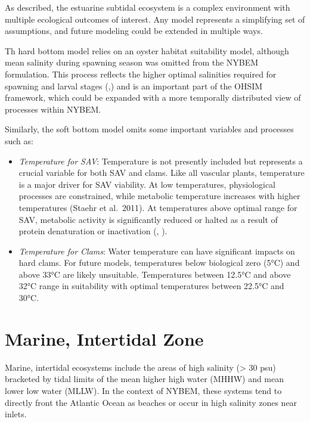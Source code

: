 \documentclass[
]{book}
\begin{document}
As described, the estuarine subtidal ecosystem is a complex environment with multiple ecological outcomes of interest. Any model represents a simplifying set of assumptions, and future modeling could be extended in multiple ways.

Th hard bottom model relies on an oyster habitat suitability model, although mean salinity during spawning season was omitted from the NYBEM formulation. This process reflects the higher optimal salinities required for spawning and larval stages (\citet{butler_summary_1954},\citet{cake_habitat_1983}) and is an important part of the OHSIM framework, which could be expanded with a more temporally distributed view of processes within NYBEM.

Similarly, the soft bottom model omits some important variables and processes such as:

\begin{itemize}
\item
  \emph{Temperature for SAV}: Temperature is not presently included but represents a crucial variable for both SAV and clams. Like all vascular plants, temperature is a major driver for SAV viability. At low temperatures, physiological processes are constrained, while metabolic temperature increases with higher temperatures (Staehr et al.~2011). At temperatures above optimal range for SAV, metabolic activity is significantly reduced or halted as a result of protein denaturation or inactivation (\citet{atkin_thermal_2003}, \citet{jensen_psi-k_2000}).
\item
  \emph{Temperature for Clams}: Water temperature can have significant impacts on hard clams. For future models, temperatures below biological zero (5°C) and above 33°C are likely unsuitable. Temperatures between 12.5°C and above 32°C range in suitability with optimal temperatures between 22.5°C and 30°C.
\end{itemize}

\hypertarget{marine-intertidal-zone}{%
\section{Marine, Intertidal Zone}\label{marine-intertidal-zone}}

Marine, intertidal ecosystems include the areas of high salinity (\textgreater{} 30 psu) bracketed by tidal limits of the mean higher high water (MHHW) and mean lower low water (MLLW). In the context of NYBEM, these systems tend to directly front the Atlantic Ocean as beaches or occur in high salinity zones near inlets.
\end{document}
